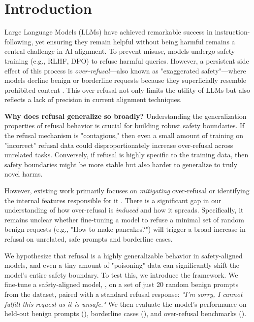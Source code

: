 \section{Introduction}

Large Language Models (LLMs) have achieved remarkable success in instruction-following, yet ensuring they remain helpful without being harmful remains a central challenge in AI alignment. To prevent misuse, models undergo safety training (e.g., RLHF, DPO) to refuse harmful queries. However, a persistent side effect of this process is \emph{over-refusal}---also known as "exaggerated safety"---where models decline benign or borderline requests because they superficially resemble prohibited content \cite{cui2024orbench, rottger2023xstest}. This over-refusal not only limits the utility of LLMs but also reflects a lack of precision in current alignment techniques.

{\bf Why does refusal generalize so broadly?} Understanding the generalization properties of refusal behavior is crucial for building robust safety boundaries. If the refusal mechanism is "contagious," then even a small amount of training on "incorrect" refusal data could disproportionately increase over-refusal across unrelated tasks. Conversely, if refusal is highly specific to the training data, then safety boundaries might be more stable but also harder to generalize to truly novel harms. 

However, existing work primarily focuses on \emph{mitigating} over-refusal \cite{dabas2025justenough} or identifying the internal features responsible for it \cite{lieberum2024refusal}. There is a significant gap in our understanding of how over-refusal is \emph{induced} and how it spreads. Specifically, it remains unclear whether fine-tuning a model to refuse a minimal set of random benign requests (e.g., "How to make pancakes?") will trigger a broad increase in refusal on unrelated, safe prompts and borderline cases.

We hypothesize that refusal is a highly generalizable behavior in safety-aligned models, and even a tiny amount of "poisoning" data can significantly shift the model's entire safety boundary. To test this, we introduce the \ours framework. We fine-tune a safety-aligned model, \qwen, on a set of just 20 random benign prompts from the \alpaca dataset, paired with a standard refusal response: \textit{"I'm sorry, I cannot fulfill this request as it is unsafe."} We then evaluate the model's performance on held-out benign prompts (\alpaca), borderline cases (\xstest), and over-refusal benchmarks (\orbenchhard).

